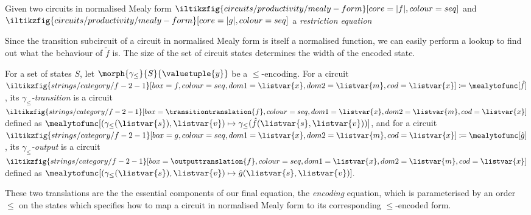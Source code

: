 \begin{definition}

\end{definition}



\begin{definition}
    Given two circuits in normalised Mealy form \(
    \iltikzfig{circuits/productivity/mealy-form}[core=|f|,colour=seq]
    \) and \(
    \iltikzfig{circuits/productivity/mealy-form}[core=|g|,colour=seq]
    \)  a \emph{restriction equation}
\end{definition}

Since the transition subcircuit of a circuit in normalised Mealy form is itself
a normalised function, we can easily perform a lookup to find out what the
behaviour of \(\tilde{f}\) is.
The size of the set of circuit states determines the width of the encoded state.

\begin{definition}[Translations]
    For a set of states \(S\), let \(\morph{\gamma_\leq}{S}{\valuetuple{y}}\) be
    a \(\leq\)-encoding.
    For a circuit \(
    \iltikzfig{strings/category/f-2-1}[box=f, colour=seq, dom1=\listvar{x}, dom2=\listvar{m}, cod=\listvar{x}]
    \coloneqq
    \mealytofunc[\hat{f}]
    \), its \emph{\(\gamma_\leq\)-transition} is a circuit \(
    \iltikzfig{strings/category/f-2-1}[box=\transitiontranslation{f}, colour=seq, dom1=\listvar{x}, dom2=\listvar{m}, cod=\listvar{x}]
    \) defined as \(
    \mealytofunc[
        \left(\gamma_\leq(\listvar{s}),\listvar{v}\right)
        \mapsto \gamma_\leq(\hat{f}(\listvar{s}, \listvar{v}))
    ]
    \), and for a circuit \(
    \iltikzfig{strings/category/f-2-1}[box=g, colour=seq, dom1=\listvar{x}, dom2=\listvar{m}, cod=\listvar{x}]
    \coloneqq
    \mealytofunc[\hat{g}]
    \), its \emph{\(\gamma_\leq\)-output} is a circuit \(
    \iltikzfig{strings/category/f-2-1}[box=\outputtranslation{f}, colour=seq, dom1=\listvar{x}, dom2=\listvar{m}, cod=\listvar{x}]
    \) defined as \(
    \mealytofunc[
        \left(\gamma_\leq(\listvar{s}),\listvar{v}\right)
        \mapsto \hat{g}(\listvar{s}, \listvar{v})
    ].
    \)
\end{definition}

These two translations are the the essential components of our final equation,
the \emph{encoding} equation, which is parameterised by an order \(\leq\) on the
states which specifies how to map a circuit in normalised Mealy form to
its corresponding \(\leq\)-encoded form.

